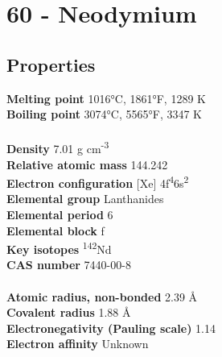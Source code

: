 \section{60 - Neodymium}
\label{sec:elem-neodymium}
\subsection{Properties}
\textbf{Melting point} 1016°C, 1861°F, 1289 K\\
\textbf{Boiling point} 3074°C, 5565°F, 3347 K\\
\\
\textbf{Density} 7.01 g cm\textsuperscript{-3}\\
\textbf{Relative atomic mass} 144.242\\
\textbf{Electron configuration} [Xe] 4f\textsuperscript{4}6s\textsuperscript{2}\\
\textbf{Elemental group} Lanthanides\\
\textbf{Elemental period} 6\\
\textbf{Elemental block} f\\
\textbf{Key isotopes} \textsuperscript{142}Nd\\
\textbf{CAS number} 7440-00-8\\
\\
\textbf{Atomic radius, non-bonded} 2.39 Å\\
\textbf{Covalent radius} 1.88 Å\\
\textbf{Electronegativity (Pauling scale)} 1.14\\
\textbf{Electron affinity} Unknown\\